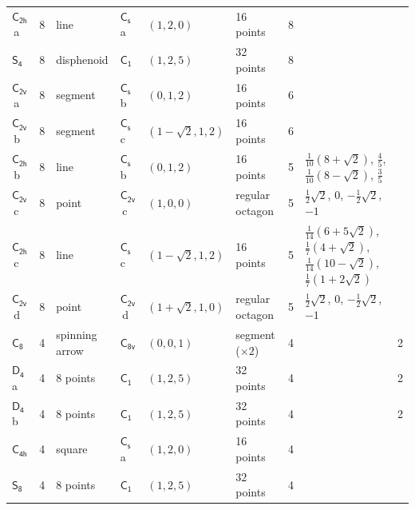 \documentclass[10pt,a4paper]{article}
\numberwithin{equation}{section}
\newcommand{\grp}[1]{\mathsf{#1}}
\newcommand{\clsletter}[1]{\,{\scriptsize\color{black!55}#1}}
\newlength{\fillwidth}\newlength{\cellwidth}\newlength{\colwidth}
\begin{document}
{{\begin{longtable}{@{}lrllllr>{\RaggedRight\arraybackslash}p{\fillwidth}r@{}}
\href{C2h.pdf}{$\grp{C_{2h}}$}\clsletter{a} & 8 & line & \href{C1v.pdf}{$\grp{C_{s}}$}\clsletter{a} & $(1, 2, 0)$ & 16 points & 8 &  & \\
\href{S4.pdf}{$\grp{S_{4}}$} & 8 & disphenoid & \href{C1.pdf}{$\grp{C_{1}}$} & $(1, 2, 5)$ & 32 points & 8 &  & \\
\href{C2v.pdf}{$\grp{C_{2v}}$}\clsletter{a} & 8 & segment & \href{C1v.pdf}{$\grp{C_{s}}$}\clsletter{b} & $(0, 1, 2)$ & 16 points & 6 &  & \\
\href{C2v.pdf}{$\grp{C_{2v}}$}\clsletter{b} & 8 & segment & \href{C1v.pdf}{$\grp{C_{s}}$}\clsletter{c} & $(1 - \sqrt{2}, 1, 2)$ & 16 points & 6 &  & \\
\href{C2h.pdf}{$\grp{C_{2h}}$}\clsletter{b} & 8 & line & \href{C1v.pdf}{$\grp{C_{s}}$}\clsletter{b} & $(0, 1, 2)$ & 16 points & 5 & ${\tfrac{1}{10}(8 + \sqrt{2})}$, ${\tfrac{4}{5}}$, ${\tfrac{1}{10}(8 - \sqrt{2})}$, ${\tfrac{3}{5}}$ & \\
\href{C2v.pdf}{$\grp{C_{2v}}$}\clsletter{c} & 8 & point & \href{C2v.pdf}{$\grp{C_{2v}}$}\clsletter{c} & $(1, 0, 0)$ & regular octagon & 5 & ${\tfrac{1}{2}\sqrt{2}}$, ${0}$, ${-\tfrac{1}{2}\sqrt{2}}$, ${-1}$ & \\
\href{C2h.pdf}{$\grp{C_{2h}}$}\clsletter{c} & 8 & line & \href{C1v.pdf}{$\grp{C_{s}}$}\clsletter{c} & $(1 - \sqrt{2}, 1, 2)$ & 16 points & 5 & ${\tfrac{1}{14}(6 + 5\sqrt{2})}$, ${\tfrac{1}{7}(4 + \sqrt{2})}$, ${\tfrac{1}{14}(10 - \sqrt{2})}$, ${\tfrac{1}{7}(1 + 2\sqrt{2})}$ & \\
\href{C2v.pdf}{$\grp{C_{2v}}$}\clsletter{d} & 8 & point & \href{C2v.pdf}{$\grp{C_{2v}}$}\clsletter{d} & $(1 + \sqrt{2}, 1, 0)$ & regular octagon & 5 & ${\tfrac{1}{2}\sqrt{2}}$, ${0}$, ${-\tfrac{1}{2}\sqrt{2}}$, ${-1}$ & \\
\href{C8.pdf}{$\grp{C_{8}}$} & 4 & spinning arrow & \href{C8v.pdf}{$\grp{C_{8v}}$} & $(0, 0, 1)$ & segment (${\times}2$) & 4 &  & 2\\
\href{D4.pdf}{$\grp{D_{4}}$}\clsletter{a} & 4 & 8 points & \href{C1.pdf}{$\grp{C_{1}}$} & $(1, 2, 5)$ & 32 points & 4 &  & 2\\
\href{D4.pdf}{$\grp{D_{4}}$}\clsletter{b} & 4 & 8 points & \href{C1.pdf}{$\grp{C_{1}}$} & $(1, 2, 5)$ & 32 points & 4 &  & 2\\
\href{C4h.pdf}{$\grp{C_{4h}}$} & 4 & square & \href{C1v.pdf}{$\grp{C_{s}}$}\clsletter{a} & $(1, 2, 0)$ & 16 points & 4 &  & \\
\href{S8.pdf}{$\grp{S_{8}}$} & 4 & 8 points & \href{C1.pdf}{$\grp{C_{1}}$} & $(1, 2, 5)$ & 32 points & 4 &  & \\

\end{longtable}}}
\end{document}
